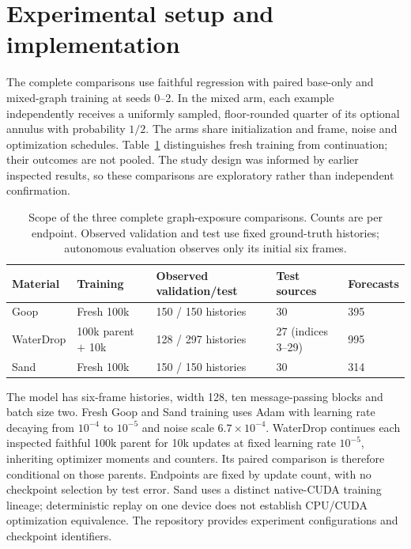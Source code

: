 \appendix
\onecolumn

\section{Experimental setup and implementation}
\label{sec:implementation-details}
The complete comparisons use faithful regression with paired base-only and mixed-graph training at seeds 0--2. In the mixed arm, each example independently receives a uniformly sampled, floor-rounded quarter of its optional annulus with probability $1/2$. The arms share initialization and frame, noise and optimization schedules. Table~\ref{tab:experiment-scope} distinguishes fresh training from continuation; their outcomes are not pooled. The study design was informed by earlier inspected results, so these comparisons are exploratory rather than independent confirmation.

\begin{table}[!ht]
\centering\small
\caption{Scope of the three complete graph-exposure comparisons. Counts are per endpoint. Observed validation and test use fixed ground-truth histories; autonomous evaluation observes only its initial six frames.}
\label{tab:experiment-scope}
\begin{tabular}{lllll}
\toprule
Material & Training & Observed validation/test & Test sources & Forecasts\\
\midrule
Goop & Fresh 100k & 150 / 150 histories & 30 & 395\\
WaterDrop & 100k parent $+$ 10k & 128 / 297 histories & 27 (indices 3--29) & 995\\
Sand & Fresh 100k & 150 / 150 histories & 30 & 314\\
\bottomrule
\end{tabular}
\end{table}

The model has six-frame histories, width 128, ten message-passing blocks and batch size two. Fresh Goop and Sand training uses Adam with learning rate decaying from $10^{-4}$ to $10^{-5}$ and noise scale $6.7\times10^{-4}$. WaterDrop continues each inspected faithful 100k parent for 10k updates at fixed learning rate $10^{-5}$, inheriting optimizer moments and counters. Its paired comparison is therefore conditional on those parents. Endpoints are fixed by update count, with no checkpoint selection by test error. Sand uses a distinct native-CUDA training lineage; deterministic replay on one device does not establish CPU/CUDA optimization equivalence. The repository provides experiment configurations and checkpoint identifiers.

